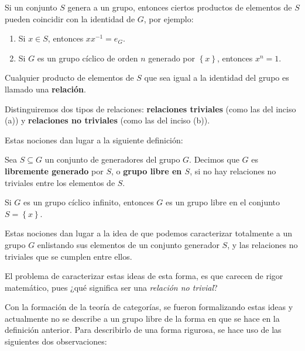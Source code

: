 \documentclass[12pt]{report}
\newcounter{it}
\theoremstyle{largebreak}
\begin{document}
    Si un conjunto $S$ genera a un grupo, entonces ciertos productos de elementos de $S$ pueden coincidir con la identidad de $G$, por ejemplo:
    \renewcommand{\theenumi}{\alph{enumi}}
    \begin{enumerate}
        \item Si $x\in S$, entonces $xx^{-1}=e_G$.
        \item Si $G$ es un grupo cíclico de orden $n$ generado por $\left\{x\right\}$, entonces $x^n=1$.
    \end{enumerate}

    Cualquier producto de elementos de $S$ que sea igual a la identidad del grupo es llamado una \textbf{relación}.

    Distinguiremos dos tipos de relaciones: \textbf{relaciones triviales} (como las del inciso (a)) y \textbf{relaciones no triviales} (como las del inciso (b)).

    Estas nociones dan lugar a la siguiente definición:

    \begin{mydef}
        Sea $S\subseteq G$ un conjunto de generadores del grupo $G$. Decimos que $G$ es \textbf{libremente generado} por $S$, o \textbf{grupo libre en $S$}, si no hay relaciones no triviales entre los elementos de $S$.
    \end{mydef}

    \begin{exa}
        Si $G$ es un grupo cíclico infinito, entonces $G$ es un grupo libre en el conjunto $S=\left\{x \right\}$.
    \end{exa}

    Estas nociones dan lugar a la idea de que podemos caracterizar totalmente a un grupo $G$ enlistando sus elementos de un conjunto generador $S$, y las relaciones no triviales que se cumplen entre ellos.
    
    El problema de caracterizar estas ideas de esta forma, es que carecen de rigor matemático, pues ¿qué significa ser una \textit{relación no trivial}?

    Con la formación de la teoría de categorías, se fueron formalizando estas ideas y actualmente no se describe a un grupo libre de la forma en que se hace en la definición anterior. Para describirlo de una forma rigurosa, se hace uso de las siguientes dos observaciones:
\end{document}
